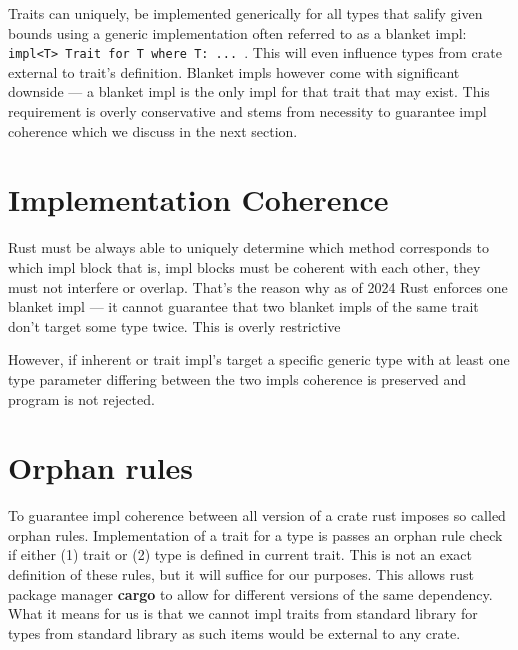 Traits can uniquely, be implemented generically for all types that salify given bounds using a generic implementation often referred to as a blanket impl:
\texttt{impl<T> Trait for T where T: ... }.
This will even influence types from crate external to trait's definition. Blanket impls however come with significant downside --- a blanket impl is the only impl for that trait that may exist.
This requirement is overly conservative and stems from necessity to guarantee impl coherence which we discuss in the next section.

\section{Implementation Coherence}
\label{sec:coherence}

Rust must be always able to uniquely determine which method corresponds to which impl block that is, impl blocks must be coherent with each other, they must not interfere or overlap.
That's the reason why as of 2024 Rust enforces one blanket impl --- it cannot guarantee that two blanket impls of the same trait don't target some type twice.
This is overly restrictive 

However, if inherent or trait impl's target a specific generic type with at least one type parameter differing between the two impls coherence is preserved and program is not rejected.

\section{Orphan rules}

To guarantee impl coherence between all version of a crate rust imposes so called orphan rules.
Implementation of a trait for a type is passes an orphan rule check if either (1) trait or (2) type is defined in current trait.
This is not an exact definition of these rules, but it will suffice for our purposes.
This allows rust package manager \textbf{cargo} to allow for different versions of the same dependency.
What it means for us is that we cannot impl traits from standard library for types from standard library as such items would be external to any crate.
